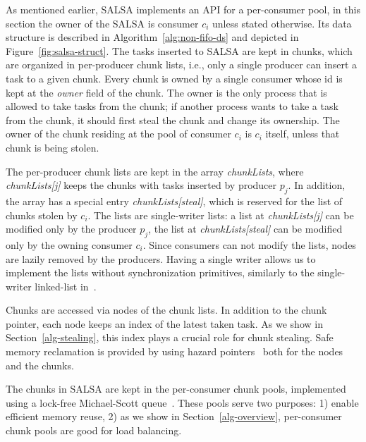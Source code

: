 As mentioned earlier, SALSA implements an API for a per-consumer pool, in this section the owner of the SALSA is consumer $c_i$ unless stated otherwise.
Its data structure is described in Algorithm~\ref{alg:non-fifo-ds} and depicted in Figure~\ref{fig:salsa-struct}. 
The tasks inserted to SALSA are kept in chunks, which are organized in per-producer chunk lists, i.e., only a single producer
can insert a task to a given chunk. Every chunk is owned by a single consumer whose id is kept at the \emph{owner} field of the chunk.
The owner is the only process that is allowed to take tasks from the chunk; if another process wants to take a task from the chunk, it should first steal the chunk and change its ownership. The owner of the chunk
residing at the pool of consumer $c_i$ is $c_i$ itself, unless that chunk is being stolen.

The per-producer chunk lists are kept in the array \emph{chunkLists}, where \emph{chunkLists[j]} keeps the chunks
with tasks inserted by producer $p_j$. 
In addition, the array has a special entry \emph{chunkLists[steal]}, which is reserved for the list of chunks stolen by $c_i$. 
The lists are single-writer lists: a list at \emph{chunkLists[j]} can be modified only by the producer $p_j$, the list at \emph{chunkLists[steal]} can be modified only by the owning consumer $c_i$. Since consumers can not modify the lists, nodes are lazily removed by the producers. Having a single writer allows us to implement the lists without synchronization primitives, similarly to the single-writer linked-list in~\cite{Michael:2004:HPS:987524.987595}.

Chunks are accessed via nodes of the chunk lists. In addition to the chunk pointer, each node keeps an index of the latest taken task. As we show in Section~\ref{alg-stealing}, this index plays a crucial role for chunk stealing. 
Safe memory reclamation is provided by using hazard pointers~\cite{Michael:2004:HPS:987524.987595} both for the nodes and the chunks.

The chunks in SALSA are kept in the per-consumer chunk pools, implemented using a lock-free Michael-Scott queue~\cite{Michael:1996:SFP:248052.248106}. 
These pools serve two purposes: 1) enable efficient memory reuse, 2) as we show in Section~\ref{alg-overview}, per-consumer chunk pools are good for load balancing. 

